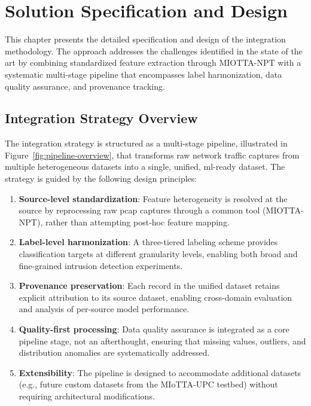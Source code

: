 \chapter{Solution Specification and Design}
\label{ch:solution-design}

This chapter presents the detailed specification and design of the integration methodology. The approach addresses the challenges identified in the state of the art by combining standardized feature extraction through MIOTTA-NPT with a systematic multi-stage pipeline that encompasses label harmonization, data quality assurance, and provenance tracking.

\section{Integration Strategy Overview}
\label{sec:strategy}

The integration strategy is structured as a multi-stage pipeline, illustrated in Figure~\ref{fig:pipeline-overview}, that transforms raw network traffic captures from multiple heterogeneous datasets into a single, unified, \gls{ml}-ready dataset. The strategy is guided by the following design principles:

\begin{enumerate}
    \item \textbf{Source-level standardization}: Feature heterogeneity is resolved at the source by reprocessing raw \gls{pcap} captures through a common tool (MIOTTA-NPT), rather than attempting post-hoc feature mapping.

    \item \textbf{Label-level harmonization}: A three-tiered labeling scheme provides classification targets at different granularity levels, enabling both broad and fine-grained intrusion detection experiments.

    \item \textbf{Provenance preservation}: Each record in the unified dataset retains explicit attribution to its source dataset, enabling cross-domain evaluation and analysis of per-source model performance.

    \item \textbf{Quality-first processing}: Data quality assurance is integrated as a core pipeline stage, not an afterthought, ensuring that missing values, outliers, and distribution anomalies are systematically addressed.

    \item \textbf{Extensibility}: The pipeline is designed to accommodate additional datasets (e.g., future custom datasets from the MIoTTA-UPC testbed) without requiring architectural modifications.
\end{enumerate}

